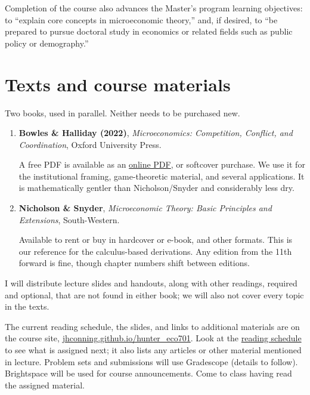 \documentclass[11pt]{article}
\begin{document}
Completion of the course also advances the Master's program learning objectives: to ``explain core concepts in microeconomic theory,'' and, if desired, to ``be prepared to pursue doctoral study in economics or related fields such as public policy or demography.''

\section{Texts and course materials}
Two books, used in parallel. Neither needs to be purchased new.

\begin{enumerate}[before=\normalfont]
\item \textbf{Bowles \& Halliday (2022)}, \emph{Microeconomics: Competition, Conflict, and Coordination}, Oxford University Press. 

A free PDF is available as an \href{https://sites.santafe.edu/~bowles/wp-content/uploads/BH_22_merged.pdf}{online PDF}, or softcover purchase. We use it for the institutional framing, game-theoretic material, and several applications. It is mathematically gentler than Nicholson/Snyder and considerably less dry.

\item \textbf{Nicholson \& Snyder}, \emph{Microeconomic Theory: Basic Principles and Extensions}, South-Western. 

Available to rent or buy in hardcover or e-book, and other formats. This is our reference for the calculus-based derivations. Any edition from the 11th forward is fine, though chapter numbers shift between editions.
\end{enumerate}

I will distribute lecture slides and handouts, along with other readings,
required and optional, that are not found in either book; we will also not cover
every topic in the texts. 

The current reading schedule, the slides, and links to additional materials are on the course site,
\href{https://jhconning.github.io/hunter_eco701/}{jhconning.github.io/hunter\_eco701}.
Look at the \href{https://jhconning.github.io/hunter_eco701/schedule}{reading
schedule} to see what is assigned next; it also lists any articles or other
material mentioned in lecture. Problem sets and submissions will use Gradescope (details to follow). Brightspace will be used for course announcements. Come to class having read the assigned material.
\end{document}
